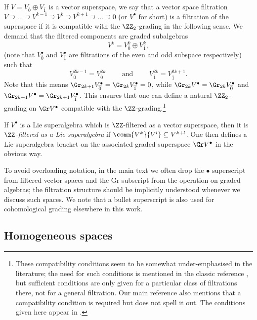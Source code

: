 If $V=V_{\overline{0}}\oplus V_{\overline{1}}$ is a vector superspace, we say that a vector space filtration $V \supseteq \dots \supseteq V^{k-1} \supseteq V^k \supseteq V^{k+1} \supseteq \dots \supseteq 0$ (or $V^\bullet$ for short) is a filtration of the superspace if it is compatible with the $\ZZ_2$-grading in the following sense. We demand that the filtered components are graded subalgebras
\begin{equation}\label{eq:filter-super-1}
	V^k = V^k_{\overline{0}} \oplus V^k_{\overline{1}},
\end{equation}
(note that $V^\bullet_{\overline{0}}$ and $V^\bullet_{\overline{1}}$ are filtrations of the even and odd subspace respectively) such that
\begin{equation}\label{eq:filter-super-2}
	V^{2k-1}_{\overline{0}} = V^{2k}_{\overline{0}}
	\qquad	\text{ and } \qquad
	V^{2k}_{\overline{1}} = V^{2k+1}_{\overline{1}}.
\end{equation}
Note that this means $\Gr_{2k+1}V^\bullet_{\overline 0}=\Gr_{2k}V^\bullet_{\overline 1}=0$, while $\Gr_{2k} V^\bullet=\Gr_{2k} V^\bullet_{\overline0}$ and $\Gr_{2k+1} V^\bullet = \Gr_{2k+1} V^\bullet_{\overline 1}$. This ensures that one can define a natural $\ZZ_2$-grading on $\Gr V^\bullet$ compatible with the $\ZZ$-grading.\footnote{These compatibility conditions seem to be somewhat under-emphasised in the literature; the need for such conditions is mentioned in the classic reference \cite{Kac1977}, but sufficient conditions are only given for a particular class of filtrations there, not for a general filtration. Our main reference \cite{Cheng1998} also mentions that a compatibility condition is required but does not spell it out. The conditions given here appear in \cite{Scheunert1979}.}

If $V^\bullet$ is a Lie superalgebra which is $\ZZ$-filtered as a vector superspace, then it is \emph{$\ZZ$-filtered as a Lie superalgebra} if $\comm{V^k}{V^l}\subseteq V^{k+l}$. One then defines a Lie superalgebra bracket on the associated graded superspace $\Gr V^\bullet$ in the obvious way.

To avoid overloading notation, in the main text we often drop the $\bullet$ superscript from filtered vector spaces and the $\mathrm{Gr}$ subscript from the operation on graded algebras; the filtration structure should be implicitly understood whenever we discuss such spaces. We note that a bullet superscript is also used for cohomological grading elsewhere in this work.
	
\subsection{Homogeneous spaces}
\label{sec:homog-spaces}

